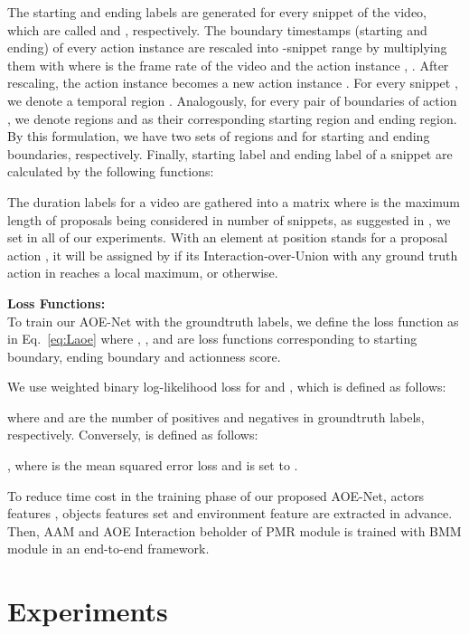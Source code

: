 \documentclass[sn-mathphys]{sn-jnl}
\theoremstyle{thmstyleone}\newtheorem{theorem}{Theorem}\newtheorem{proposition}[theorem]{Proposition}
\theoremstyle{thmstyletwo}\newtheorem{example}{Example}\newtheorem{remark}{Remark}
\theoremstyle{thmstylethree}\newtheorem{definition}{Definition}
\begin{document}
The starting and ending labels are generated for every snippet of the video, which are called  and , respectively. The boundary timestamps (starting and ending) of every action instance  are rescaled into -snippet range by multiplying them with  where  is the frame rate of the video and the action instance ,  . After rescaling, the action instance  becomes a new action instance . For every snippet , we denote a temporal region . Analogously, for every pair of boundaries  of action , we denote regions  and  as their corresponding starting region and ending region. By this formulation, we have two sets of regions  and  for starting and ending boundaries, respectively. Finally, starting label  and ending label  of a snippet  are calculated by the following functions:

\begin{multicols}{2}
\centering

\end{multicols}

The duration labels for a video are gathered into a matrix  where  is the maximum length of proposals being considered in number of snippets, as suggested in \cite{bmn}, we set  in all of our experiments. With an element at position  stands for a proposal action , it will be assigned by  if its Interaction-over-Union with any ground truth action in  reaches a local maximum, or  otherwise.

\vspace{2mm}
\noindent\textbf{Loss Functions:}\\
To train our AOE-Net with the groundtruth labels, we define the loss function  as in Eq.~\ref{eq:Laoe} where , , and  are loss functions corresponding to starting boundary, ending boundary and actionness score.



We use weighted binary log-likelihood loss  for  and , which is defined as follows:


\noindent
where  and  are the number of positives and negatives in groundtruth labels, respectively. Conversely,  is defined as follows:

, where  is the mean squared error loss and  is set to .

To reduce time cost in the training phase of our proposed AOE-Net, actors features , objects features set  and environment feature  are extracted in advance. Then, AAM and AOE Interaction beholder of PMR module is trained with BMM module in an end-to-end framework.

\section{Experiments}
\end{document}
